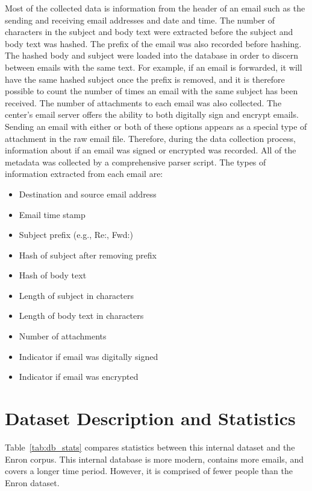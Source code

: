 \documentclass[12pt]{report}
\begin{document}
Most of the collected data is information from the header of an email such as the sending and receiving email addresses and date and time.
The number of characters in the subject and body text were extracted before the subject and body text was hashed.
The prefix of the email was also recorded before hashing.
The hashed body and subject were loaded into the database in order to discern between emails with the same text.
For example, if an email is forwarded, it will have the same hashed subject once the prefix is removed, and it is therefore possible to count the number of times an email with the same subject has been received.
The number of attachments to each email was also collected.
The center's email server offers the ability to both digitally sign and encrypt emails.
Sending an email with either or both of these options appears as a special type of attachment in the raw email file.
Therefore, during the data collection process, information about if an email was signed or encrypted was recorded.  All of the metadata was collected by a comprehensive parser script.  The types of information extracted from each email are:
\begin{itemize}
	\setlength\itemsep{-0.75em}
	  
	\item Destination and source email address    
	\item Email time stamp                        
	\item Subject prefix (e.g., Re:, Fwd:)        
	\item Hash of subject after removing prefix   
	\item Hash of body text                       
	\item Length of subject in characters         
	\item Length of body text in characters       
	\item Number of attachments                   
	\item Indicator if email was digitally signed 
	\item Indicator if email was encrypted        

\end{itemize}



\section{Dataset Description and Statistics}
Table~\ref{tab:db_stats} compares statistics between this internal dataset and the Enron corpus.
This internal database is more modern, contains more emails, and covers a longer time period.
However, it is comprised of fewer people than the Enron dataset.
\end{document}
